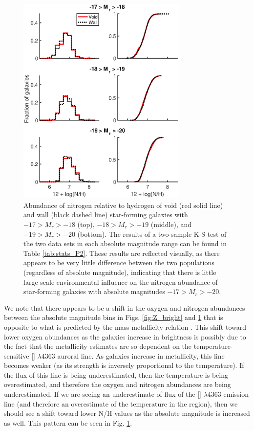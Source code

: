 \begin{figure}
    \centering
    \includegraphics[width=0.75\textwidth]{Images/Paper2/1sig_17-20_SF_t3_12logNH_stacked}
    \caption[Nitrogen distribution of star-forming galaxies with 
    $-17 > M_r > -20$]{Abundance of nitrogen relative to hydrogen of void (red 
    solid line) and wall (black dashed line) star-forming galaxies with 
    $-17 > M_r > -18$ (top), $-18 > M_r > -19$ (middle), and $-19 > M_r > -20$ 
    (bottom).  The results of a two-sample K-S test of the two data sets in each 
    absolute magnitude range can be found in Table \ref{tab:stats_P2}.  These 
    results are reflected visually, as there appears to be very little 
    difference between the two populations (regardless of absolute magnitude), 
    indicating that there is little large-scale environmental influence on the 
    nitrogen abundance of star-forming galaxies with absolute magnitudes 
    $-17 > M_r > -20$.}
    \label{fig:N_bright}
\end{figure}

We note that there appears to be a shift in the oxygen and nitrogen abundances 
between the absolute magnitude bins in Figs. \ref{fig:Z_bright} and 
\ref{fig:N_bright} that is opposite to what is predicted by the mass-metallicity 
relation \citep{Tremonti04}.  This shift toward lower oxygen abundances as the 
galaxies increase in brightness is possibly due to the fact that the metallicity 
estimates are so dependent on the temperature-sensitive [] 
$\lambda 4363$ auroral line.  As galaxies increase in metallicity, this line 
becomes weaker (as its strength is inversely proportional to the temperature).  
If the flux of this line is being underestimated, then the temperature is being 
overestimated, and therefore the oxygen and nitrogen abundances are being 
underestimated.  If we are seeing an underestimate of flux of the [] 
$\lambda 4363$ emission line (and therefore an overestimate of the temperature 
in the region), then we should see a shift toward lower N/H values as the 
absolute magnitude is increased as well.  This pattern can be seen in Fig. 
\ref{fig:N_bright}.

